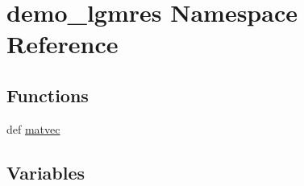 \hypertarget{namespacedemo__lgmres}{}\section{demo\+\_\+lgmres Namespace Reference}
\label{namespacedemo__lgmres}
\subsection*{Functions}
\begin{DoxyCompactItemize}
\item 
def \hyperlink{namespacedemo__lgmres_a0b933f4e768a500950c8f0e736826307}{matvec}
\end{DoxyCompactItemize}
\subsection*{Variables}
